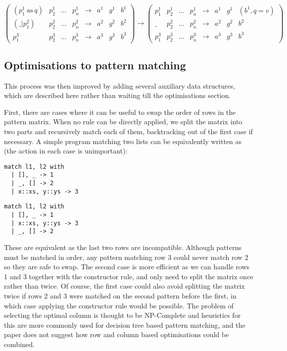 $
\begin{pmatrix}
(p^1_1\ \mathrm{as}\ q) & p^1_2 & \dots & p^1_n & \to & a^1 & g^1 & b^1 \\
(\_ | p^2_1) & p^2_2 & \dots & p^2_n & \to & a^2 & g^2 & b^2 \\
p^3_1 & p^3_2 & \dots & p^3_n & \to & a^3 & g^3 & b^3
\end{pmatrix}
\to
\begin{pmatrix}
 p^1_1 & p^1_2 & \dots & p^1_n  & \to & a^1 & g^1 & (b^1, q=v) \\
\_ & p^2_2 & \dots & p^2_n  & \to & a^2 & g^2 & b^2 \\
p^3_1 & p^3_2 & \dots & p^3_n  & \to & a^3 & g^3 & b^3
\end{pmatrix}
$


\subsection{Optimisations to pattern matching}
This process was then improved by adding several auxiliary data structures, which are described here rather than waiting till the optimisations section.


First, there are cases where it can be useful to swap the order of rows in the pattern matrix. When no rule can be directly applied, we split the matrix into two parts and recursively match each of them, backtracking out of the first case if necessary. A simple program matching two lists can be equivalently written as (the action in each case is unimportant):

\begin{minipage}{0.45\textwidth}
\begin{verbatim}
match l1, l2 with
  | [], _ -> 1
  | _, [] -> 2
  | x::xs, y::ys -> 3
\end{verbatim}
\end{minipage}\qquad
\begin{minipage}{0.45\textwidth}
\begin{verbatim}
match l1, l2 with
  | [], _ -> 1
  | x::xs, y::ys -> 3
  | _, [] -> 2
\end{verbatim}
\end{minipage}

These are equivalent as the last two rows are incompatible. Although patterns must be matched in order, any pattern matching row 3 could never match row 2 so they are safe to swap. The second case is more efficient as we can handle rows 1 and 3 together with the constructor rule, and only need to split the matrix once rather than twice. Of course, the first case could also avoid splitting the matrix twice if rows 2 and 3 were matched on the second pattern before the first, in which case applying the constructor rule would be possible. The problem of selecting the optimal column is thought to be NP-Complete and heuristics for this are more commonly used for decision tree based pattern matching, and the paper does not suggest how row and column based optimisations could be combined. %

